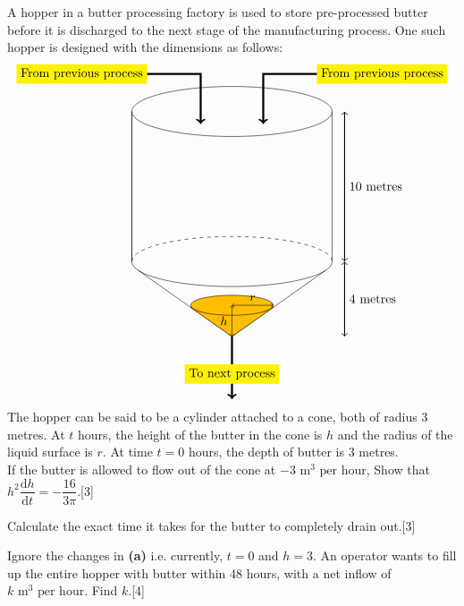 \documentclass[12pt, a4 paper]{article}
\begin{document}
\begin{outline}[enumerate]
 \1 A hopper in a butter processing factory is used to store pre-processed butter before it is discharged to the next stage of the manufacturing process. One such hopper is designed with the dimensions as follows: %
 \[
  \begin{tikzpicture}
   \draw (0,0) ellipse (80pt and 20pt); %
   \draw (-80pt,0) -- (-80pt,-120pt);
   \draw (80pt,0) -- (80pt,-120pt);
   \draw (-80pt,0) -- (-80pt,-120pt);
   \draw[dashed] (-80pt,-120pt) arc (180:0:80pt and 20pt);
   \draw (-80pt,-120pt) arc (180:360:80pt and 20pt);
   \draw[<->,thick] (90pt,0) -- (90pt,-60pt) node[right] {10 metres} -- (90pt,-120pt);%
   \draw (-75pt,-127pt) -- (0, -180pt); %
   \draw (0,-180pt) -- (75pt,-127pt);
   \draw[<->,thick] (90pt,-120pt) -- (90pt,-150pt) node[right] {4 metres} -- (90pt,-180pt);%
   \draw[->,ultra thick] (-120pt,30pt) node [fill=yellow]{From previous process}-- (-25pt,30pt) -- (-25pt,-10pt); %
   \draw[->,ultra thick] (120pt,30pt) node [fill=yellow]{From previous process}-- (25pt,30pt) -- (25pt,-10pt);
   \draw[->,ultra thick] (0,-180pt) -- (0,-210pt) node[fill=yellow]{To next process} -- (0,-230pt); %
   \filldraw [orange!50!yellow,draw=black](0,-180pt) -- (33pt,-156.68pt) -- (-33pt,-156.68pt) -- cycle; %
   \filldraw [orange!50!yellow,draw=black](0,-155pt) ellipse (33pt and 8pt);
   \draw[<->] (0,-155pt) -- (16.5pt, -155pt) node [above]{$r$}-- (33pt,-155pt);
   \draw[<->] (0,-155pt) -- (0, -167.5pt) node [left]{$h$}-- (0,-180pt); %
  \end{tikzpicture}
 \]
 The hopper can be said to be a cylinder attached to a cone, both of radius 3 metres. At $t$ hours, the height of the butter in the cone is $h$ and the radius of the liquid surface is $r$. At time $t = 0$ hours, the depth of butter is 3 metres.\\

 If the butter is allowed to flow out of the cone at $- 3\textrm{ m}^3{\textrm{ per hour}}$,
 \2 Show that ${h^2}\dfrac{{{\mathrm{d}}h}}{{{\mathrm{d}}t}} =  - \dfrac{{16}}{{3\pi }}$.\hfill[3]

 \2 Calculate the exact time it takes for the butter to completely drain out.\hfill[3]

 \2 Ignore the changes in \textbf{(a)} i.e. currently, $t = 0$ and $h = 3$. An operator wants to fill up the entire hopper with butter within 48 hours, with a net inflow of $k\textrm{ m}^3{\textrm{ per hour}}$. Find $k$.\hfill[4]


\end{outline}
\end{document}
